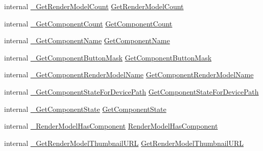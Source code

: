 \begin{DoxyCompactItemize}
\item 
internal \mbox{\hyperlink{struct_valve_1_1_v_r_1_1_i_v_r_render_models_a4957e84d66519ffebc626ccf121a607c}{\+\_\+\+Get\+Render\+Model\+Count}} \mbox{\hyperlink{struct_valve_1_1_v_r_1_1_i_v_r_render_models_aba17e8a856f5a780979f2c6d9227025d}{Get\+Render\+Model\+Count}}
\item 
internal \mbox{\hyperlink{struct_valve_1_1_v_r_1_1_i_v_r_render_models_ad3a86004136474baa0217ed18c5b8af1}{\+\_\+\+Get\+Component\+Count}} \mbox{\hyperlink{struct_valve_1_1_v_r_1_1_i_v_r_render_models_a1a8516b7e5c898a1653e5c7ace101558}{Get\+Component\+Count}}
\item 
internal \mbox{\hyperlink{struct_valve_1_1_v_r_1_1_i_v_r_render_models_aa62f5cca131966eaf77e1278e686d131}{\+\_\+\+Get\+Component\+Name}} \mbox{\hyperlink{struct_valve_1_1_v_r_1_1_i_v_r_render_models_a7cc186fe1abfbb36dcb43515df428ce5}{Get\+Component\+Name}}
\item 
internal \mbox{\hyperlink{struct_valve_1_1_v_r_1_1_i_v_r_render_models_a5a1b0a485a820f88672d43c1ab53cf09}{\+\_\+\+Get\+Component\+Button\+Mask}} \mbox{\hyperlink{struct_valve_1_1_v_r_1_1_i_v_r_render_models_a60dc144e8e593e6bec5830409089c238}{Get\+Component\+Button\+Mask}}
\item 
internal \mbox{\hyperlink{struct_valve_1_1_v_r_1_1_i_v_r_render_models_adda4a057b8145c45eb98857d941973dc}{\+\_\+\+Get\+Component\+Render\+Model\+Name}} \mbox{\hyperlink{struct_valve_1_1_v_r_1_1_i_v_r_render_models_af8eff8d00cb37e245ab3e4de06e4c20a}{Get\+Component\+Render\+Model\+Name}}
\item 
internal \mbox{\hyperlink{struct_valve_1_1_v_r_1_1_i_v_r_render_models_a3ad1b8d8db45befef29127e2c1072741}{\+\_\+\+Get\+Component\+State\+For\+Device\+Path}} \mbox{\hyperlink{struct_valve_1_1_v_r_1_1_i_v_r_render_models_afe0feb2b6c3d9c5a4c1fe4961c925a6b}{Get\+Component\+State\+For\+Device\+Path}}
\item 
internal \mbox{\hyperlink{struct_valve_1_1_v_r_1_1_i_v_r_render_models_af79285d56f002d4aee1bfc4ad0b1bb78}{\+\_\+\+Get\+Component\+State}} \mbox{\hyperlink{struct_valve_1_1_v_r_1_1_i_v_r_render_models_a6a379a1430d19540fde2e149e5fe11d6}{Get\+Component\+State}}
\item 
internal \mbox{\hyperlink{struct_valve_1_1_v_r_1_1_i_v_r_render_models_ae4724e8f8a0a8d43df490e731a70307c}{\+\_\+\+Render\+Model\+Has\+Component}} \mbox{\hyperlink{struct_valve_1_1_v_r_1_1_i_v_r_render_models_a7add3a8bd0c882490fa75b3053444137}{Render\+Model\+Has\+Component}}
\item 
internal \mbox{\hyperlink{struct_valve_1_1_v_r_1_1_i_v_r_render_models_afd1ebaace88f5874dc31699503bba86e}{\+\_\+\+Get\+Render\+Model\+Thumbnail\+U\+RL}} \mbox{\hyperlink{struct_valve_1_1_v_r_1_1_i_v_r_render_models_ac9fd279f8bdc7f4b2d9bd27d0157b231}{Get\+Render\+Model\+Thumbnail\+U\+RL}}

\end{DoxyCompactItemize}
